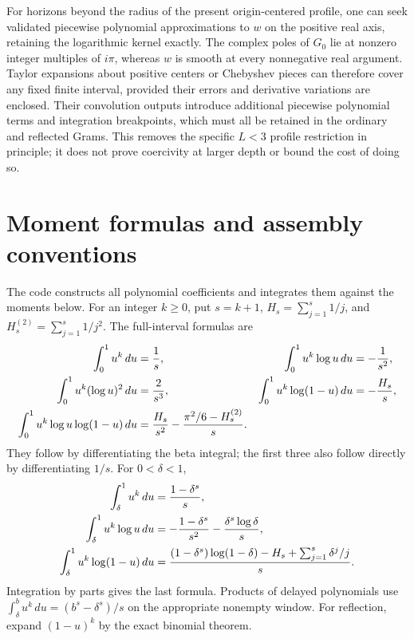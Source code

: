 \documentclass[11pt]{article}
\numberwithin{equation}{section}
\theoremstyle{definition}
\theoremstyle{remark}
\begin{document}
For horizons beyond the radius of the present origin-centered profile,
one can seek validated piecewise polynomial approximations to $w$ on the
positive real axis, retaining the logarithmic kernel exactly. The complex
poles of $G_0$ lie at nonzero integer multiples of $i\pi$, whereas $w$ is
smooth at every nonnegative real argument. Taylor expansions about positive
centers or Chebyshev pieces can therefore cover any fixed finite interval,
provided their errors and derivative variations are enclosed. Their convolution
outputs introduce additional piecewise polynomial terms and integration
breakpoints, which must all be retained in the ordinary and reflected Grams.
This removes the specific $L<3$ profile restriction in principle; it does not
prove coercivity at larger depth or bound the cost of doing so.

\appendix
\section{Moment formulas and assembly conventions}\label{app:moments}

The code constructs all polynomial coefficients and integrates them against
the moments below. For an integer $k\ge0$, put $s=k+1$,
$H_s=\sum_{j=1}^s1/j$, and $H_s^{(2)}=\sum_{j=1}^s1/j^2$.
The full-interval formulas are
\begin{align}
 \int_0^1u^k\,du&=\frac1s,&
 \int_0^1u^k\log u\,du&=-\frac1{s^2},\notag\\
 \int_0^1u^k(\log u)^2\,du&=\frac2{s^3},&
 \int_0^1u^k\log(1-u)\,du&=-\frac{H_s}{s},\label{eq:moments}\\
 \int_0^1u^k\log u\log(1-u)\,du
 &=\frac{H_s}{s^2}-\frac{\pi^2/6-H_s^{(2)}}s.\notag
\end{align}
They follow by differentiating the beta integral; the first three also
follow directly by differentiating $1/s$.
For $0<\delta<1$,
\begin{align}
 \int_\delta^1u^k\,du&=\frac{1-\delta^s}s,\notag\\
 \int_\delta^1u^k\log u\,du
 &=-\frac{1-\delta^s}{s^2}-\frac{\delta^s\log\delta}s,\label{eq:tailmoments}\\
 \int_\delta^1u^k\log(1-u)\,du
 &=\frac{(1-\delta^s)\log(1-\delta)-H_s+\sum_{j=1}^s\delta^j/j}{s}.
 \notag
\end{align}
Integration by parts gives the last formula. Products of delayed
polynomials use
$\int_\delta^b u^k\,du=(b^s-\delta^s)/s$ on the appropriate nonempty
window. For reflection, expand $(1-u)^k$ by the exact binomial theorem.
\end{document}
